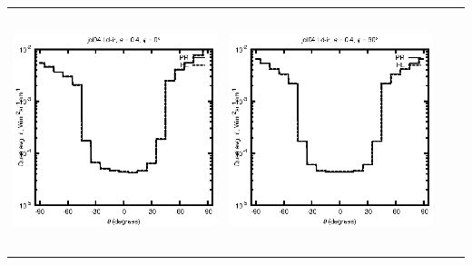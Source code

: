 \begin{tabular}{c c c c}
\includegraphics[height=7cm]{../eps/jol04_Ld_ir_fwd.eps} &
\includegraphics[height=7cm]{../eps/jol04_Ld_ir_cross.eps} \\
\end{tabular}

\pagebreak

